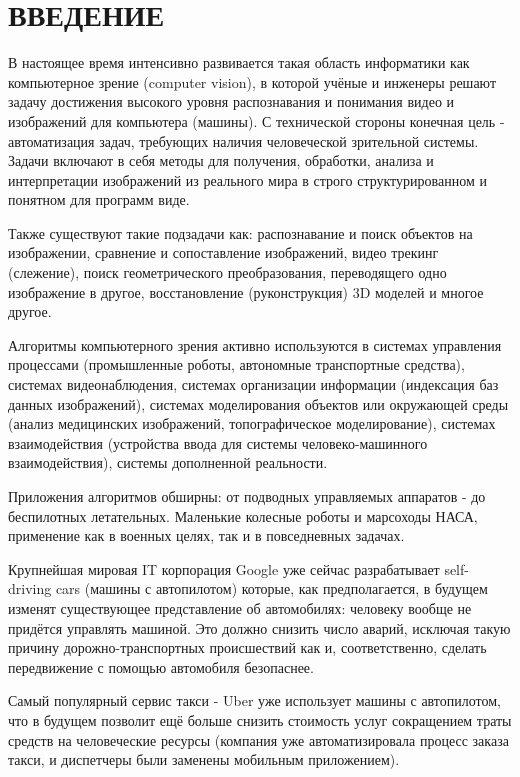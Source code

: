 \chapter*{ВВЕДЕНИЕ}

В настоящее время интенсивно развивается такая область информатики как компьютерное зрение (computer vision), в которой учёные и инженеры решают задачу достижения высокого уровня распознавания и понимания видео и изображений для компьютера (машины). С технической стороны конечная цель - автоматизация задач, требующих наличия человеческой зрительной системы. Задачи включают в себя методы для получения, обработки, анализа и интерпретации изображений из реального мира в строго структурированном и понятном для программ виде.

Также существуют такие подзадачи как: распознавание и поиск объектов на изображении, сравнение и сопоставление изображений, видео трекинг (слежение), поиск геометрического преобразования, переводящего одно изображение в другое, восстановление (руконструкция) 3D моделей и многое другое.

Алгоритмы компьютерного зрения активно используются в системах управления процессами (промышленные роботы, автономные транспортные средства), системах видеонаблюдения, системах организации информации (индексация баз данных изображений), системах моделирования объектов или окружающей среды (анализ медицинских изображений, топографическое моделирование), системах взаимодействия (устройства ввода для системы человеко-машинного взаимодействия), системы дополненной реальности.

Приложения алгоритмов обширны: от подводных управляемых аппаратов - до беспилотных летательных. Маленькие колесные роботы и марсоходы НАСА, применение как в военных целях, так и в повседневных задачах.

Крупнейшая мировая IT корпорация Google уже сейчас разрабатывает self-driving cars (машины с автопилотом) которые, как предполагается, в будущем изменят существующее представление об автомобилях: человеку вообще не придётся управлять машиной. Это должно снизить число аварий, исключая такую причину дорожно-транспортных происшествий как  и, соответственно, сделать передвижение с помощью автомобиля безопаснее.

Самый популярный сервис такси - Uber уже использует машины с автопилотом, что в будущем позволит ещё больше снизить стоимость услуг сокращением траты средств на человеческие ресурсы (компания уже автоматизировала процесс заказа такси, и диспетчеры были заменены мобильным приложением).

